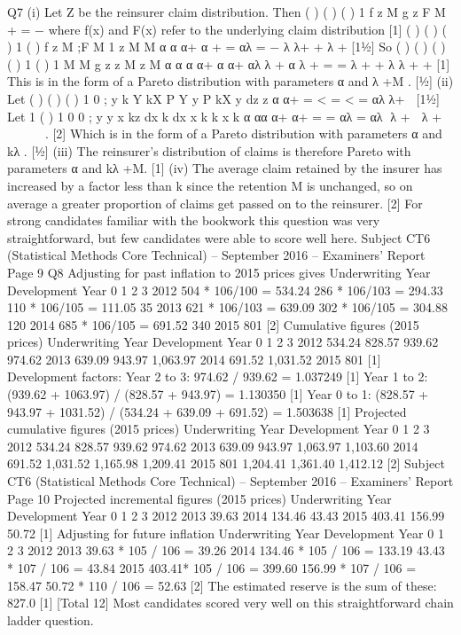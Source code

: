 Q7 (i) Let Z be the reinsurer claim distribution.
Then ( ) ( )
( )
1
f z M
g z
F M
+
  =
  −
where f(x) and F(x) refer to the underlying claim
distribution [1]
( )
( )
( )
1 ( ) f z M ;F M 1
z M M
α α
α+ α
+ = αλ = − λ
λ+ + λ +
  [1½]
So ( )
( )
( ) ( )
1 ( ) 1
M M
g z
z M z M
α α α
α+ α α+
  αλ λ + α λ + = =
  λ + + λ λ + +
  [1]
This is in the form of a Pareto distribution with parameters α and λ +M . [½]
(ii) Let ( ) ( )
( ) 1
0
;
y
k
Y kX P Y y P kX y dz
z
α
α+
  = < = < = αλ
λ+  [1½]
Let
1 ( ) 1
0 0
;
y y x kz dx k dx
x k k x
k
α αα
α+ α+
  = = αλ = αλ
λ +  λ +  
 
  . [2]
Which is in the form of a Pareto distribution with parameters α and kλ . [½]
(iii) The reinsurer’s distribution of claims is therefore Pareto with parameters α
and kλ +M. [1]
(iv) The average claim retained by the insurer has increased by a factor less than k
since the retention M is unchanged, so on average a greater proportion of
claims get passed on to the reinsurer. [2]
For strong candidates familiar with the bookwork this question was very
straightforward, but few candidates were able to score well here.
Subject CT6 (Statistical Methods Core Technical) – September 2016 – Examiners’ Report
Page 9
Q8 Adjusting for past inflation to 2015 prices gives
Underwriting
Year
Development Year
0
1 2 3
2012 504 * 106/100
= 534.24
286 * 106/103
= 294.33
110 * 106/105
= 111.05
35
2013 621 * 106/103
= 639.09
302 * 106/105
= 304.88
120
2014 685 * 106/105
= 691.52
340
2015 801
[2]
Cumulative figures (2015 prices)
Underwriting
Year
Development Year
0
1 2 3
2012 534.24 828.57 939.62 974.62
2013 639.09 943.97 1,063.97
2014 691.52 1,031.52
2015 801
[1]
Development factors:
  Year 2 to 3: 974.62 / 939.62 = 1.037249 [1]
Year 1 to 2: (939.62 + 1063.97) / (828.57 + 943.97) = 1.130350 [1]
Year 0 to 1: (828.57 + 943.97 + 1031.52) / (534.24 + 639.09 + 691.52) = 1.503638
[1]
Projected cumulative figures (2015 prices)
Underwriting
Year
Development Year
0 1 2
3
2012 534.24 828.57 939.62 974.62
2013 639.09 943.97 1,063.97 1,103.60
2014 691.52 1,031.52 1,165.98 1,209.41
2015 801 1,204.41 1,361.40 1,412.12
[2]
Subject CT6 (Statistical Methods Core Technical) – September 2016 – Examiners’ Report
Page 10
Projected incremental figures (2015 prices)
Underwriting
Year
Development Year
0
1 2 3
2012
2013 39.63
2014 134.46 43.43
2015 403.41 156.99 50.72
[1]
Adjusting for future inflation
Underwriting
Year
Development Year
0
1 2 3
2012
2013 39.63 * 105 / 106
= 39.26
2014 134.46 * 105 / 106
= 133.19
43.43 * 107 / 106
= 43.84
2015 403.41* 105 / 106
= 399.60
156.99 * 107 / 106
= 158.47
50.72 * 110 / 106
= 52.63
[2]
The estimated reserve is the sum of these: 827.0 [1]
[Total 12]
Most candidates scored very well on this straightforward chain ladder
question.
